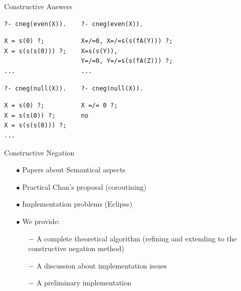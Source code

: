 \documentclass[pdf,slideColor,contemporain]{prosper}
\begin{document}
\begin{slide}{Constructive Answers}
\vspace{-0.5cm}
\begin{small}
\hspace{-0.8cm}
\begin{verbatim}
?- cneg(even(X)).    ?- cneg(even(X)).
\end{verbatim}
{\blue \begin{verbatim}
X = s(0) ?;          X=/=0, X=/=s(s(fA(Y))) ?;
X = s(s(s(0))) ?;    X=s(s(Y)), 
                     Y=/=0, Y=/=s(s(fA(Z))) ?;
...                  ...

\end{verbatim}}


\begin{verbatim}
?- cneg(null(X)).    ?- cneg(null(X)).
\end{verbatim}
{\blue \begin{verbatim}
X = s(0) ?;          X =/= 0 ?;
X = s(s(0)) ?;       no
X = s(s(s(0))) ?;      
...                
\end{verbatim} }
\end{small}
\end{slide}

\begin{slide}{Constructive Negation}
     \begin{itemize}
        \item[{\blue $\bullet$}] Papers about {\blue Semantical} aspects
        \item[{\blue $\bullet$}] Practical {\blue Chan}'s proposal (coroutining)
        \item[{\blue $\bullet$}] Implementation {\blue problems} (Eclipse)
        \item[{\blue $\bullet$}] We provide:
              \begin{itemize}
                \item[{\blue $-$}] A complete theoretical {\blue algorithm} (refining and extending to the constructive negation method)
                \item[{\blue $-$}] A discussion about {\blue implementation} issues
                \item[{\blue $-$}] A preliminary implementation
              \end{itemize}
     \end{itemize}

\end{slide}
\end{document}
